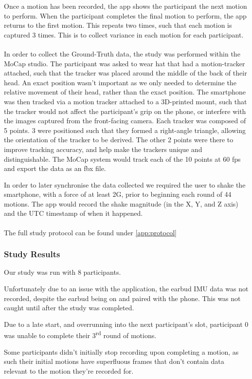 Once a motion has been recorded, the app shows the participant the next motion to perform. When the participant completes the final motion to perform, the app returns to the first motion. This repeats two times, such that each motion is captured 3 times. This is to collect variance in each motion for each participant.
\\\\
In order to collect the Ground-Truth data, the study was performed within the MoCap studio. The participant was asked to wear hat that had a motion-tracker attached, such that the tracker was placed around the middle of the back of their head. An exact position wasn't important as we only needed to determine the relative movement of their head, rather than the exact position.
The smartphone was then tracked via a motion tracker attached to a 3D-printed mount, such that the tracker would not affect the participant's grip on the phone, or interfere with the images captured from the front-facing camera.
Each tracker was composed of 5 points. 3 were positioned such that they formed a right-angle triangle, allowing the orientation of the tracker to be derived. The other 2 points were there to improve tracking accuracy, and help make the trackers unique and distinguishable.
The MoCap system would track each of the 10 points at 60 fps and export the data as an fbx file.

In order to later synchronise the data collected we required the user to shake the smartphone, with a force of at least 2G, prior to beginning each round of 44 motions. The app would record the shake magnitude (in the X, Y, and Z axis) and the UTC timestamp of when it happened.
\\\\
The full study protocol can be found under \autoref{app:protocol}

\subsubsection{Study Results}
Our study was run with 8 participants.

Unfortunately due to an issue with the application, the earbud IMU data was not recorded, despite the earbud being on and paired with the phone. This was not caught until after the study was completed.

Due to a late start, and overrunning into the next participant's slot, participant 0 was unable to complete their 3\textsuperscript{rd} round of motions.

Some participants didn't initially stop recording upon completing a motion, as such their initial motions have superfluous frames that don't contain data relevant to the motion they're recorded for.



